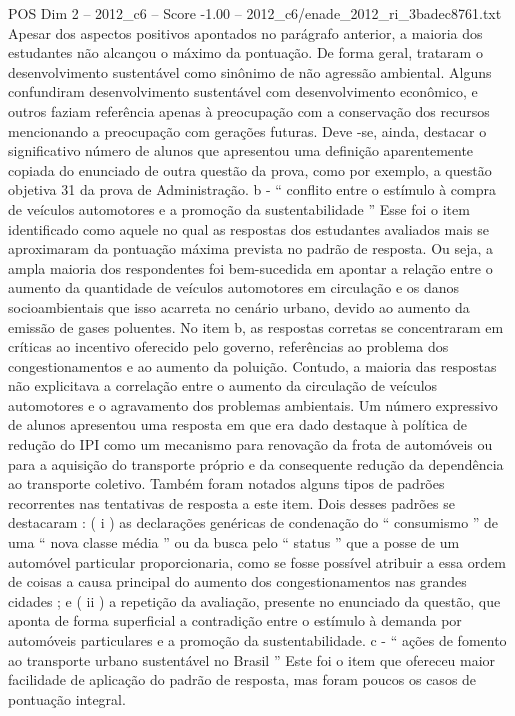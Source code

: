 \begin{textsample}{POS Dim 2 – 2012\_c6 – Score -1.00 – 2012\_c6/enade\_2012\_ri\_3badec8761.txt}
Apesar dos aspectos positivos apontados no parágrafo anterior, a maioria dos estudantes não alcançou o máximo da pontuação.
De forma geral, trataram o desenvolvimento sustentável como sinônimo de não agressão ambiental.
Alguns confundiram desenvolvimento sustentável com desenvolvimento econômico, e outros faziam referência apenas à preocupação com a conservação dos recursos mencionando a preocupação com gerações futuras.
Deve -se, ainda, destacar o significativo número de alunos que apresentou uma definição aparentemente copiada do enunciado de outra questão da prova, como por exemplo, a questão objetiva 31 da prova de Administração. b - “ conflito entre o estímulo à compra de veículos automotores e a promoção da sustentabilidade ” Esse foi o item identificado como aquele no qual as respostas dos estudantes avaliados mais se aproximaram da pontuação máxima prevista no padrão de resposta.
Ou seja, a ampla maioria dos respondentes foi bem-sucedida em apontar a relação entre o aumento da quantidade de veículos automotores em circulação e os danos socioambientais que isso acarreta no cenário urbano, devido ao aumento da emissão de gases poluentes.
No item b, as respostas corretas se concentraram em críticas ao incentivo oferecido pelo governo, referências ao problema dos congestionamentos e ao aumento da poluição.
Contudo, a maioria das respostas não explicitava a correlação entre o aumento da circulação de veículos automotores e o agravamento dos problemas ambientais.
Um número expressivo de alunos apresentou uma resposta em que era dado destaque à política de redução do IPI como um mecanismo para renovação da frota de automóveis ou para a aquisição do transporte próprio e da consequente redução da dependência ao transporte coletivo.
Também foram notados alguns tipos de padrões recorrentes nas tentativas de resposta a este item.
Dois desses padrões se destacaram : ( i ) as declarações genéricas de condenação do “ consumismo ” de uma “ nova classe média ” ou da busca pelo “ status ” que a posse de um automóvel particular proporcionaria, como se fosse possível atribuir a essa ordem de coisas a causa principal do aumento dos congestionamentos nas grandes cidades ; e ( ii ) a repetição da avaliação, presente no enunciado da questão, que aponta de forma superficial a contradição entre o estímulo à demanda por automóveis particulares e a promoção da sustentabilidade. c - “ ações de fomento ao transporte urbano sustentável no Brasil ” Este foi o item que ofereceu maior facilidade de aplicação do padrão de resposta, mas foram poucos os casos de pontuação integral.

\end{textsample}
